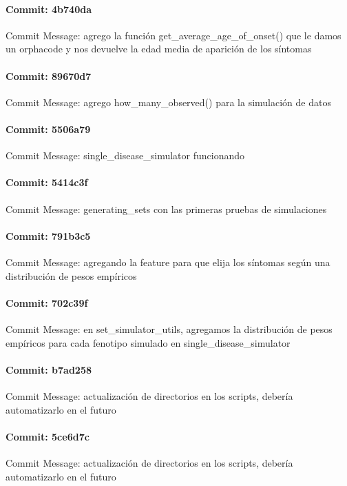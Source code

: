 \documentclass{article}
\begin{document}
\paragraph{Commit: 4b740da}
Commit Message: agrego la función get_average_age_of_onset() que le damos un orphacode y nos devuelve la edad media de aparición de los síntomas

\paragraph{Commit: 89670d7}
Commit Message: agrego how_many_observed() para la simulación de datos

\paragraph{Commit: 5506a79}
Commit Message: single_disease_simulator funcionando

\paragraph{Commit: 5414c3f}
Commit Message: generating_sets con las primeras pruebas de simulaciones

\paragraph{Commit: 791b3c5}
Commit Message: agregando la feature para que elija los síntomas según una distribución de pesos empíricos

\paragraph{Commit: 702c39f}
Commit Message: en set_simulator_utils, agregamos la distribución de pesos empíricos para cada fenotipo simulado en single_disease_simulator

\paragraph{Commit: b7ad258}
Commit Message: actualización de directorios en los scripts, debería automatizarlo en el futuro

\paragraph{Commit: 5ce6d7c}
Commit Message: actualización de directorios en los scripts, debería automatizarlo en el futuro
\end{document}
